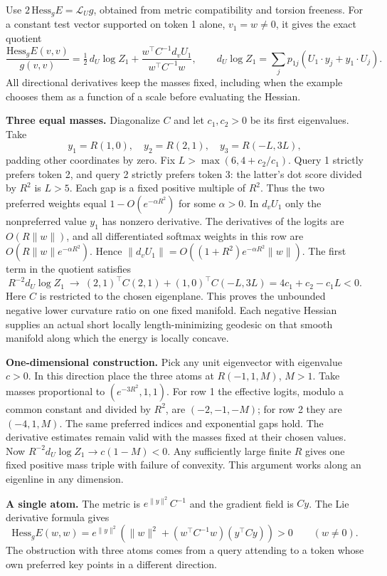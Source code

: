 \documentclass[10pt]{article}
\begin{document}
Use $2\,\mathrm{Hess}_g E=\mathcal L_U g$, obtained from metric compatibility and torsion freeness. For a constant test vector supported on token 1 alone, $v_1=w\ne0$, it gives the exact quotient
\[
 \frac{\mathrm{Hess}_g E(v,v)}{g(v,v)}=
 \tfrac12\,d_U\log Z_1+
 \frac{w^\top C^{-1}d_v U_1}{w^\top C^{-1}w},
 \qquad
 d_U\log Z_1=\sum_j p_{1j}(U_1\cdot y_j+y_1\cdot U_j).
\]
All directional derivatives keep the masses fixed, including when the example chooses them as a function of a scale before evaluating the Hessian.

\textbf{Three equal masses.} Diagonalize $C$ and let $c_1,c_2>0$ be its first eigenvalues. Take
\[
 y_1=R(1,0),\quad y_2=R(2,1),\quad y_3=R(-L,3L),
\]
padding other coordinates by zero. Fix $L>\max(6,4+c_2/c_1)$. Query 1 strictly prefers token 2, and query 2 strictly prefers token 3: the latter's dot score divided by $R^2$ is $L>5$. Each gap is a fixed positive multiple of $R^2$. Thus the two preferred weights equal $1-O(e^{-\alpha R^2})$ for some $\alpha>0$. In $d_v U_1$ only the nonpreferred value $y_1$ has nonzero derivative. The derivatives of the logits are $O(R\|w\|)$, and all differentiated softmax weights in this row are $O(R\|w\|e^{-\alpha R^2})$. Hence $\|d_v U_1\|=O((1+R^2)e^{-\alpha R^2}\|w\|)$. The first term in the quotient satisfies
\[
 R^{-2}d_U\log Z_1\ \longrightarrow\
 (2,1)^\top C(2,1)+(1,0)^\top C(-L,3L)=4c_1+c_2-c_1L<0.
\]
Here $C$ is restricted to the chosen eigenplane. This proves the unbounded negative lower curvature ratio on one fixed manifold. Each negative Hessian supplies an actual short locally length-minimizing geodesic on that smooth manifold along which the energy is locally concave.

\textbf{One-dimensional construction.} Pick any unit eigenvector with eigenvalue $c>0$. In this direction place the three atoms at $R(-1,1,M)$, $M>1$. Take masses proportional to $(e^{-3R^2},1,1)$. For row 1 the effective logits, modulo a common constant and divided by $R^2$, are $(-2,-1,-M)$; for row 2 they are $(-4,1,M)$. The same preferred indices and exponential gaps hold. The derivative estimates remain valid with the masses fixed at their chosen values. Now $R^{-2}d_U\log Z_1\to c(1-M)<0$. Any sufficiently large finite $R$ gives one fixed positive mass triple with failure of convexity. This argument works along an eigenline in any dimension.

\textbf{A single atom.} The metric is $e^{\|y\|^2} C^{-1}$ and the gradient field is $Cy$. The Lie derivative formula gives
\[
 \mathrm{Hess}_g E(w,w)=e^{\|y\|^2}\left(\|w\|^2+
 (w^\top C^{-1}w)(y^\top C y)\right)>0\qquad (w\ne0).
\]
The obstruction with three atoms comes from a query attending to a token whose own preferred key points in a different direction.
\end{document}
